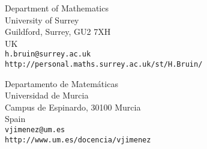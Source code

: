 \documentclass[12pt, psamsfonts, reqno]{amsart}
\begin{document}
\medskip
\noindent
Department of Mathematics\\
University of Surrey\\
Guildford, Surrey, GU2 7XH\\
UK\\
\texttt{h.bruin@surrey.ac.uk}\\
\texttt{http://personal.maths.surrey.ac.uk/st/H.Bruin/}

\medskip \noindent
Departamento de Matem\'aticas\\
Universidad de Murcia\\
Campus de Espinardo,
30100 Murcia \\
Spain \\
\texttt{vjimenez@um.es}\\
\texttt{http://www.um.es/docencia/vjimenez}\\
\end{document}
